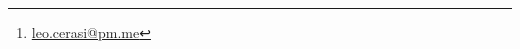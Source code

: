 \DeclareMathOperator{\sech}{sech}
\DeclareMathOperator{\Exp}{Exp}

\newcommand{\N}{\mathbb{N}}
\newcommand{\Z}{\mathbb{Z}}
\newcommand{\Q}{\mathbb{Q}}
\newcommand{\R}{\mathbb{R}}
\newcommand{\C}{\mathbb{C}}
\newcommand{\K}{\mathbb{K}}

\newcommand{\Ot}{\mathrm{O}(3)}
\newcommand{\SOt}{\mathrm{SO}(3)}
\newcommand{\On}[1]{\mathrm{O}(#1)}
\newcommand{\SOn}[1]{\mathrm{SO}(#1)}
\newcommand{\Un}[1]{\mathrm{U}(#1)}
\newcommand{\SUn}[1]{\mathrm{SU}(#1)}
\newcommand{\GL}[1]{\mathrm{GL}(#1)}
\newcommand{\SL}[1]{\mathrm{SL}(#1)}

\newcommand{\m}{\,\mathrm{m}}
\newcommand{\ang}{\,\mathrm{\AA}}
\newcommand{\fm}{\,\mathrm{fm}}

\newcommand{\barn}{\,\mathrm{barn}}

\newcommand{\cels}{\,^{\circ}\mathrm{C}}

\newcommand{\ev}{\,\mathrm{eV}}
\newcommand{\kev}{\,\mathrm{keV}}
\newcommand{\mev}{\,\mathrm{MeV}}
\newcommand{\gev}{\,\mathrm{GeV}}
\newcommand{\tev}{\,\mathrm{TeV}}

\newcommand{\g}{\mathrm{g}}
\newcommand{\w}{\mathrm{W}}
\newcommand{\z}{\mathrm{Z}}

\author{Leonardo Cerasi%
  \thanks{\scriptsize\href{mailto:leonardo.cerasi@studenti.unimi.it}{leo.cerasi@pm.me}}\\
  \small GitHub repository: \href{https://github.com/LeonardoCerasi/notes}{LeonardoCerasi/notes}}
\date{}

